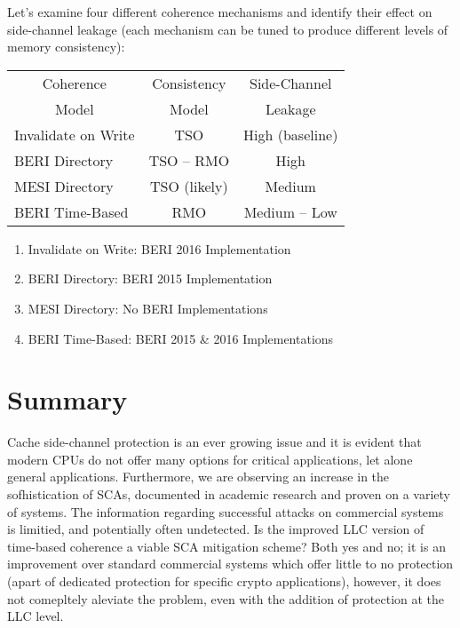 	Let's examine four different coherence mechanisms and identify their effect on side-channel leakage (each mechanism can be tuned to produce different levels of memory consistency):
	
	\begin{table}[h]
	\begin{center}
	\begin{tabular}[c]{|l|c|c|}
		\hline
		\multicolumn{1}{|c|}{Coherence} & Consistency & Side-Channel \\
		\multicolumn{1}{|c|}{Model} & Model & Leakage \\
		\hline
		Invalidate on Write & TSO & High (baseline) \\
		BERI Directory & TSO -- RMO & High \\
		MESI Directory & TSO (likely) & Medium \\
		BERI Time-Based & RMO & Medium -- Low \\
		\hline
	\end{tabular}
	\end{center}
	\end{table}
	
	\begin{enumerate}
		\item Invalidate on Write: BERI 2016 Implementation 
		\item BERI Directory: BERI 2015 Implementation
		\item MESI Directory: No BERI Implementations 
		\item BERI Time-Based: BERI 2015 \& 2016 Implementations
	\end{enumerate}




\section{Summary}
	Cache side-channel protection is an ever growing issue and it is evident that modern CPUs do not offer many options for critical applications, let alone general applications. Furthermore, we are observing an increase in the sofhistication of SCAs, documented in academic research and proven on a variety of systems. The information regarding successful attacks on commercial systems is limitied, and potentially often undetected. 
	Is the improved LLC version of time-based coherence a viable SCA mitigation scheme? Both yes and no; it is an improvement over standard commercial systems which offer little to no protection (apart of dedicated protection for specific crypto applications), however, it does not comepltely aleviate the problem, even with the addition of protection at the LLC level.
